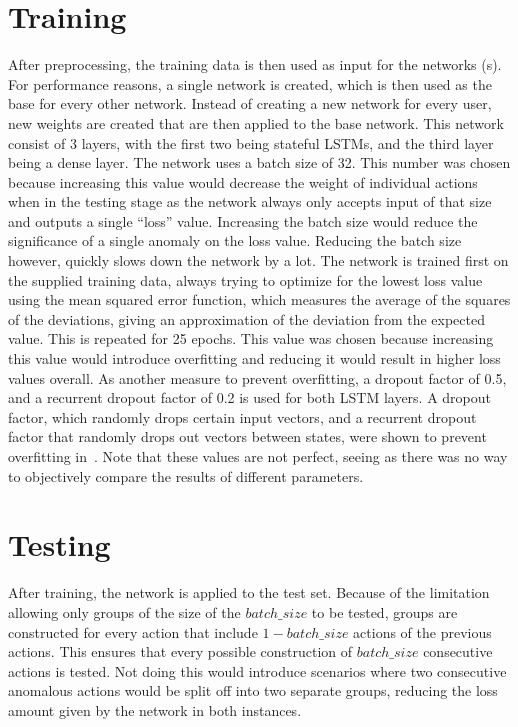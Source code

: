 \section{Training}
After preprocessing, the training data is then used as input for the networks (s). For performance reasons, a single network is created, which is then used as the base for every other network. Instead of creating a new network for every user, new weights are created that are then applied to the base network. This network consist of 3 layers, with the first two being stateful LSTMs, and the third layer being a dense layer. The network uses a batch size of 32. This number was chosen because increasing this value would decrease the weight of individual actions when in the testing stage as the network always only accepts input of that size and outputs a single \enquote{loss} value. Increasing the batch size would reduce the significance of a single anomaly on the loss value. Reducing the batch size however, quickly slows down the network by a lot. The network is trained first on the supplied training data, always trying to optimize for the lowest loss value using the mean squared error function, which measures the average of the squares of the deviations, giving an approximation of the deviation from the expected value. This is repeated for 25 epochs. This value was chosen because increasing this value would introduce overfitting and reducing it would result in higher loss values overall. As another measure to prevent overfitting, a dropout factor of 0.5, and a recurrent dropout factor of 0.2 is used for both LSTM layers. A dropout factor, which randomly drops certain input vectors, and a recurrent dropout factor that randomly drops out vectors between states, were shown to prevent overfitting in~\cite{srivastava2014dropout}. Note that these values are not perfect, seeing as there was no way to objectively compare the results of different parameters.

\section{Testing}
After training, the network is applied to the test set. Because of the limitation allowing only groups of the size of the $batch\_size$ to be tested, groups are constructed for every action that include $1 - batch\_size$ actions of the previous actions. This ensures that every possible construction of $batch\_size$ consecutive actions is tested. Not doing this would introduce scenarios where two consecutive anomalous actions would be split off into two separate groups, reducing the loss amount given by the network in both instances.

